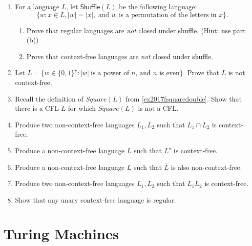 \begin{enumerate}[resume]
\item {} For a language $L$, let $\textsf{Shuffle}(L)$ be the following language:
\[
\{ w : x \in L, |w| = |x|,\;\text{and $w$ is a permutation of the letters in $x$} \}.
\]
\begin{enumerate}
	\item Prove that regular languages are \emph{not} closed under shuffle. (Hint: use part (b))
	\item Prove that context-free languages are \emph{not} closed under shuffle.
\end{enumerate}

\item {} Let $L = \{w \in \{0, 1\}^\star : |w|\;\text{is a power of $n$, and $n$ is even}\}$. Prove that $L$ is not context-free.

\item {} Recall the definition of $Square(L)$ from \cref{ex2017fsquaredouble}. 
	Show that there is a CFL $L$ for which $Square(L)$ is not a CFL.

\item {} Produce two non-context-free languages $L_1, L_2$ such that $L_1 \cap L_2$ is context-free.

\item {} Produce a non-context-free language $L$ such that $L^\star$ is context-free.

\item {} Produce a non-context-free language $L$ such that $\overline{L}$ is also non-context-free.

\item {} Produce two non-context-free languages $L_1, L_2$ such that $L_1 L_2$ is context-free.

\item {} Show that any unary context-free language is regular.
\end{enumerate}

\section{Turing Machines}

